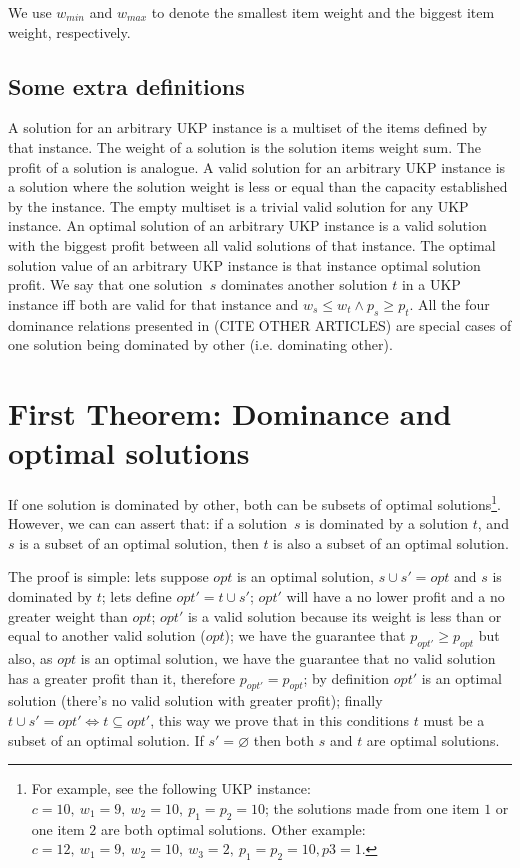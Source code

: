\documentclass[12pt]{article}
\begin{document}
We use \(w_{min}\) and \(w_{max}\) to denote the smallest item weight and the biggest item weight, respectively.

\subsection{Some extra definitions}

A solution for an arbitrary UKP instance is a multiset of the items defined by that instance. The weight of a solution is the solution items weight sum. The profit of a solution is analogue. A valid solution for an arbitrary UKP instance is a solution where the solution weight is less or equal than the capacity established by the instance. The empty multiset is a trivial valid solution for any UKP instance. An optimal solution of an arbitrary UKP instance is a valid solution with the biggest profit between all valid solutions of that instance. The optimal solution value of an arbitrary UKP instance is that instance optimal solution profit. We say that one solution~\(s\) dominates another solution \(t\) in a UKP instance iff both are valid for that instance and \(w_s \leq w_t \land p_s \geq p_t\). All the four dominance relations presented in (CITE OTHER ARTICLES) are special cases of one solution being dominated by other (i.e. dominating other).

\section{First Theorem: Dominance and optimal solutions}

If one solution is dominated by other, both can be subsets of optimal solutions\footnote{For example, see the following UKP instance: \(c = 10,~w_1 = 9,~w_2 = 10,~p_1 = p_2 = 10\); the solutions made from one item \(1\) or one item \(2\) are both optimal solutions. Other example: \(c = 12,~w_1 = 9,~w_2 = 10,~w_3 = 2,~p_1 = p_2 = 10, p3 = 1\).}. However, we can can assert that: if a solution~\(s\) is dominated by a solution \(t\), and \(s\) is a subset of an optimal solution, then \(t\) is also a subset of an optimal solution.

The proof is simple: lets suppose \(opt\) is an optimal solution, \(s \cup s' = opt\) and \(s\) is dominated by \(t\); lets define \(opt' = t \cup s'\); \(opt'\) will have a no lower profit and a no greater weight than \(opt\); \(opt'\) is a valid solution because its weight is less than or equal to another valid solution (\(opt\)); we have the guarantee that \(p_{opt'} \geq p_{opt}\) but also, as \(opt\) is an optimal solution, we have the guarantee that no valid solution has a greater profit than it, therefore \(p_{opt'} = p_{opt}\); by definition \(opt'\) is an optimal solution (there's no valid solution with greater profit); finally \(t \cup s' = opt' \iff t \subseteq opt'\), this way we prove that in this conditions \(t\) must be a subset of an optimal solution. If \(s' = \varnothing\) then both \(s\) and \(t\) are optimal solutions.
\end{document}
